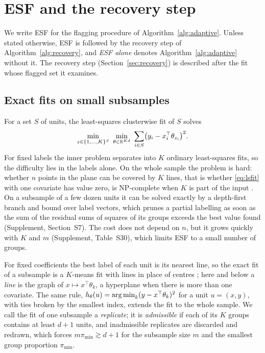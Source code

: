 \section{ESF and the recovery step}
\label{sec:method}

We write ESF for the flagging procedure of Algorithm~\ref{alg:adaptive}. Unless stated
otherwise, ESF is followed by the recovery step of Algorithm~\ref{alg:recovery}, and
\emph{ESF alone} denotes Algorithm~\ref{alg:adaptive} without it. The recovery step
(Section~\ref{sec:recovery}) is described after the fit whose flagged set it examines.

\subsection{Exact fits on small subsamples}

For a set $S$ of units, the least-squares clusterwise fit of $S$ solves
\begin{equation}
\min_{z\in\{1,\dots,K\}^{S}}\ \min_{\theta\in\R^{Kd}}\ \sum_{i\in S}\bigl(y_i-x_i^{\top}\theta_{z_i}\bigr)^{2}.
\label{eq:lsfit}
\end{equation}
For fixed labels the inner problem separates into $K$ ordinary least-squares fits, so the
difficulty lies in the labels alone. On the whole sample the problem is hard: whether $n$ points
in the plane can be covered by $K$ lines, that is whether \eqref{eq:lsfit} with one covariate has
value zero, is NP-complete when $K$ is part of the input \citep{megiddo1982complexity}. On a
subsample of a few dozen units it can be solved exactly by a depth-first branch and bound over
label vectors, which prunes a partial labelling as soon as the sum of the residual sums of
squares of its groups exceeds the best value found (Supplement, Section~S7). The cost does not depend on $n$, but it grows quickly with $K$ and $m$ (Supplement,
Table~S30), which limits ESF to a small number of groups.

For fixed coefficients the best label of each unit is its nearest line, so the exact fit of a
subsample is a $K$-means fit with lines in place of centres \citep{pollard1981strong}; here
and below a \emph{line} is the graph of $x\mapsto x^{\top}\theta_k$, a hyperplane when there
is more than one covariate. The same rule, $h_{\theta}(u)=\operatorname*{arg\,min}_k(y-x^{\top}\theta_k)^{2}$ for a unit $u=(x,y)$, with ties
broken by the smallest index, extends the fit to the whole sample. We call the fit of one
subsample a \emph{replicate}; it is \emph{admissible} if each of its $K$ groups contains at
least $d+1$ units, and inadmissible replicates are discarded and redrawn, which forces
$m\pi_{\min}\gtrsim d+1$ for the subsample size $m$ and the smallest group proportion
$\pi_{\min}$.

